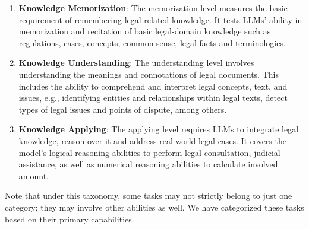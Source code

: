 \begin{enumerate}
    \item \textbf{Knowledge Memorization}: The memorization level measures the basic requirement of remembering legal-related knowledge. It tests LLMs' ability in memorization and recitation of basic legal-domain knowledge such as regulations, cases, concepts, common sense, legal facts and terminologies.
    \item \textbf{Knowledge Understanding}: The understanding level involves understanding the meanings and connotations of legal documents. This includes the ability to comprehend and interpret legal concepts, text, and issues, e.g., identifying entities and relationships within legal texts, detect types of legal issues and points of dispute, among others.
    \item \textbf{Knowledge Applying}: The applying level requires LLMs to integrate legal knowledge, reason over it and address real-world legal cases. It covers the model's logical reasoning abilities to perform legal consultation, judicial assistance, as well as numerical reasoning abilities to calculate involved amount.
\end{enumerate}

Note that under this taxonomy, some tasks may not strictly belong to just one category; they may involve other abilities as well. We have categorized these tasks based on their primary capabilities.

